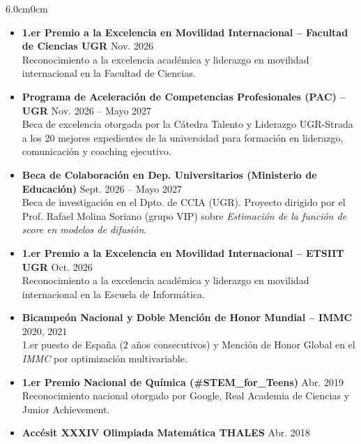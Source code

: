 \documentclass[10pt, a4paper]{article}
\begin{document}
\begin{adjustwidth}{6.0cm}{0cm}
\begin{itemize}[leftmargin=*, nosep, topsep=1pt, itemsep=1.5pt]
    \item \textbf{\color{darktext}\footnotesize 1.er Premio a la Excelencia en Movilidad Internacional -- Facultad de Ciencias UGR} \hfill {\scriptsize\color{lightgray} Nov. 2026}\\
    {\scriptsize Reconocimiento a la excelencia académica y liderazgo en movilidad internacional en la Facultad de Ciencias.}
    \item \textbf{\color{darktext}\footnotesize Programa de Aceleración de Competencias Profesionales (PAC) -- UGR} \hfill {\scriptsize\color{lightgray} Nov. 2026 -- Mayo 2027}\\
    {\scriptsize Beca de excelencia otorgada por la Cátedra Talento y Liderazgo UGR-Strada a los 20 mejores expedientes de la universidad para formación en liderazgo, comunicación y coaching ejecutivo.}
    \item \textbf{\color{darktext}\footnotesize Beca de Colaboración en Dep. Universitarios (Ministerio de Educación)} \hfill {\scriptsize\color{lightgray} Sept. 2026 -- Mayo 2027}\\
    {\scriptsize Beca de investigación en el Dpto. de CCIA (UGR). Proyecto dirigido por el Prof. Rafael Molina Soriano (grupo VIP) sobre \textit{Estimación de la función de score en modelos de difusión}.}
    \item \textbf{\color{darktext}\footnotesize 1.er Premio a la Excelencia en Movilidad Internacional -- ETSIIT UGR} \hfill {\scriptsize\color{lightgray} Oct. 2026}\\
    {\scriptsize Reconocimiento a la excelencia académica y liderazgo en movilidad internacional en la Escuela de Informática.}
    \item \textbf{\color{darktext}\footnotesize Bicampeón Nacional y Doble Mención de Honor Mundial -- IMMC} \hfill {\scriptsize\color{lightgray} 2020, 2021}\\
    {\scriptsize 1.er puesto de España (2 años consecutivos) y Mención de Honor Global en el \textit{IMMC} por optimización multivariable.}
    \item \textbf{\color{darktext}\footnotesize 1.er Premio Nacional de Química (\#STEM\_for\_Teens)} \hfill {\scriptsize\color{lightgray} Abr. 2019}\\
    {\scriptsize Reconocimiento nacional otorgado por Google, Real Academia de Ciencias y Junior Achievement.}
    \item \textbf{\color{darktext}\footnotesize Accésit XXXIV Olimpiada Matemática THALES} \hfill {\scriptsize\color{lightgray} Abr. 2018}
\end{itemize}

\end{adjustwidth}
\end{document}
